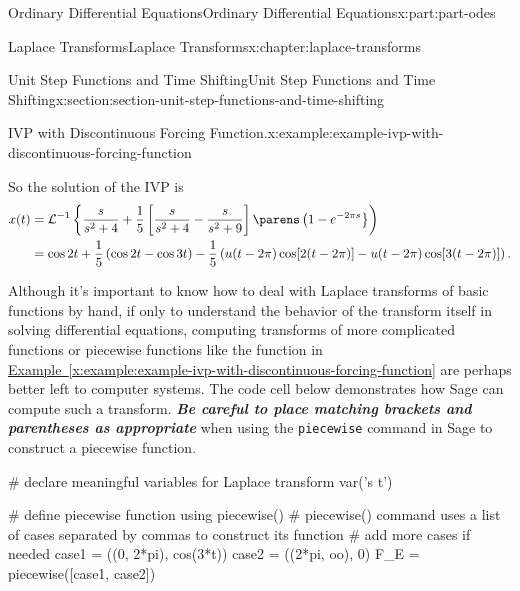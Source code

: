 \documentclass[twoside,10pt,]{book}
\newcommand{\xreffont}{\relax}
\newcommand{\mono}[1]{\texttt{#1}}
\newcommand{\alert}[1]{\textbf{\textit{#1}}}
\numberwithin{equation}{part}
\newcommand{\iLaplace}[1]{\mathcal{L}^{-1}\left\{#1\right\}}
\newcommand{\amp}{&}
\begin{document}
\begin{partptx}{Ordinary Differential Equations}{}{Ordinary Differential Equations}{}{}{x:part:part-odes}
\begin{chapterptx}{Laplace Transforms}{}{Laplace Transforms}{}{}{x:chapter:laplace-transforms}
\begin{sectionptx}{Unit Step Functions and Time Shifting}{}{Unit Step Functions and Time Shifting}{}{}{x:section:section-unit-step-functions-and-time-shifting}
\begin{example}{IVP with Discontinuous Forcing Function.}{x:example:example-ivp-with-discontinuous-forcing-function}
\begin{equation*}
\end{equation*}
%
\par
So the solution of the IVP is%
\begin{align*}
x(t) \amp= \iLaplace{\frac{s}{s^{2}+4} + \frac{1}{5}\left[\frac{s}{s^{2}+4} - \frac{s}{s^{2}+9}\right]\parens\left(1-e^{-2\pi s}}\right)\\
\amp= \cos2t + \frac{1}{5}\left(\cos2t-\cos3t\right) - \frac{1}{5}\left(u(t-2\pi)\cos[2(t-2\pi)] - u(t-2\pi)\cos[3(t-2\pi)]\right)\text{.}
\end{align*}
%
\end{example}
Although it's important to know how to deal with Laplace transforms of basic functions by hand, if only to understand the behavior of the transform itself in solving differential equations, computing transforms of more complicated functions or piecewise functions like the function in \hyperref[x:example:example-ivp-with-discontinuous-forcing-function]{Example~{\xreffont\ref{x:example:example-ivp-with-discontinuous-forcing-function}}} are perhaps better left to computer systems. The code cell below demonstrates how Sage can compute such a transform. \alert{Be careful to place matching brackets and parentheses as appropriate} when using the \mono{piecewise} command in Sage to construct a piecewise function.%
\begin{sageinput}
# declare meaningful variables for Laplace transform
var('s t')

# define piecewise function using piecewise()
# piecewise() command uses a list of cases separated by commas to construct its function
# add more cases if needed
case1 = ((0, 2*pi), cos(3*t))
case2 = ((2*pi, oo), 0)
F_E = piecewise([case1, case2])


\end{sageinput}
\end{sectionptx}
\end{chapterptx}
\end{partptx}
\end{document}
